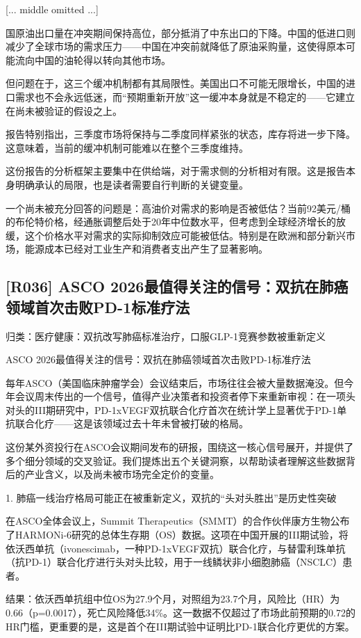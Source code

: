 \documentclass[11pt]{ctexart}
\begin{document}
[... middle omitted ...]

国原油出口量在冲突期间保持高位，部分抵消了中东出口的下降。中国的低进口则减少了全球市场的需求压力——中国在冲突前就降低了原油采购量，这使得原本可能流向中国的油轮得以转向其他市场。

但问题在于，这三个缓冲机制都有其局限性。美国出口不可能无限增长，中国的进口需求也不会永远低迷，而“预期重新开放”这一缓冲本身就是不稳定的——它建立在尚未被验证的假设之上。

报告特别指出，三季度市场将保持与二季度同样紧张的状态，库存将进一步下降。这意味着，当前的缓冲机制可能难以在整个三季度维持。

这份报告的分析框架主要集中在供给端，对于需求侧的分析相对有限。这是报告本身明确承认的局限，也是读者需要自行判断的关键变量。

一个尚未被充分回答的问题是：高油价对需求的影响是否被低估？当前92美元/桶的布伦特价格，经通胀调整后处于20年中位数水平，但考虑到全球经济增长的放缓，这个价格水平对需求的实际抑制效应可能被低估。特别是在欧洲和部分新兴市场，能源成本已经对工业生产和消费者支出产生了显著影响。

\subsection{[R036] ASCO 2026最值得关注的信号：双抗在肺癌领域首次击败PD-1标准疗法}
{\small\color{refgray}归类：医疗健康：双抗改写肺癌标准治疗，口服GLP-1竞赛参数被重新定义}

ASCO 2026最值得关注的信号：双抗在肺癌领域首次击败PD-1标准疗法

每年ASCO（美国临床肿瘤学会）会议结束后，市场往往会被大量数据淹没。但今年会议周末传出的一个信号，值得产业决策者和投资者停下来重新审视：在一项头对头的III期研究中，PD-1xVEGF双抗联合化疗首次在统计学上显著优于PD-1单抗联合化疗——这是该领域过去十年未曾被打破的格局。

这份某外资投行在ASCO会议期间发布的研报，围绕这一核心信号展开，并提供了多个细分领域的交叉验证。我们提炼出五个关键洞察，以帮助读者理解这些数据背后的产业含义，以及尚未被市场完全定价的变量。

1. 肺癌一线治疗格局可能正在被重新定义，双抗的“头对头胜出”是历史性突破

在ASCO全体会议上，Summit Therapeutics（SMMT）的合作伙伴康方生物公布了HARMONi-6研究的总体生存期（OS）数据。这项在中国开展的III期试验，将依沃西单抗（ivonescimab，一种PD-1xVEGF双抗）联合化疗，与替雷利珠单抗（抗PD-1）联合化疗进行头对头比较，用于一线鳞状非小细胞肺癌（NSCLC）患者。

结果：依沃西单抗组中位OS为27.9个月，对照组为23.7个月，风险比（HR）为0.66（p=0.0017），死亡风险降低34\%。这一数据不仅超过了市场此前预期的0.72的HR门槛，更重要的是，这是首个在III期试验中证明比PD-1联合化疗更优的方案。
\end{document}
